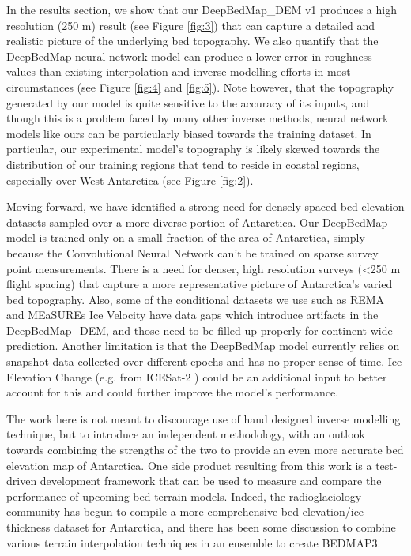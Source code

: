 \documentclass[tc, manuscript]{copernicus}
\begin{document}
In the results section, we show that our DeepBedMap\_DEM v1 produces a high resolution (250 m) result (see Figure \ref{fig:3}) that can capture a detailed and realistic picture of the underlying bed topography.
We also quantify that the DeepBedMap neural network model can produce a lower error in roughness values than existing interpolation and inverse modelling efforts in most circumstances (see Figure \ref{fig:4} and \ref{fig:5}).
Note however, that the topography generated by our model is quite sensitive to the accuracy of its inputs, and though this is a problem faced by many other inverse methods, neural network models like ours can be particularly biased towards the training dataset.
In particular, our experimental model's topography is likely skewed towards the distribution of our training regions that tend to reside in coastal regions, especially over West Antarctica (see Figure \ref{fig:2}).

Moving forward, we have identified a strong need for densely spaced bed elevation datasets sampled over a more diverse portion of Antarctica.
Our DeepBedMap model is trained only on a small fraction of the area of Antarctica, simply because the Convolutional Neural Network can't be trained on sparse survey point measurements.
There is a need for denser, high resolution surveys (<250 m flight spacing) that capture a more representative picture of Antarctica's varied bed topography.
Also, some of the conditional datasets we use such as REMA \citep{HowatReferenceElevationModel2019} and MEaSUREs Ice Velocity \citep{RignotMEaSUREsInSARBasedAntarctica2017} have data gaps which introduce artifacts in the DeepBedMap\_DEM, and those need to be filled up properly for continent-wide prediction.
Another limitation is that the DeepBedMap model currently relies on snapshot data collected over different epochs and has no proper sense of time.
Ice Elevation Change (e.g. from ICESat-2 \citep{MarkusIceCloudland2017}) could be an additional input to better account for this and could further improve the model's performance.

The work here is not meant to discourage use of hand designed inverse modelling technique, but to introduce an independent methodology, with an outlook towards combining the strengths of the two to provide an even more accurate bed elevation map of Antarctica.
One side product resulting from this work is a test-driven development framework that can be used to measure and compare the performance of upcoming bed terrain models.
Indeed, the radioglaciology community has begun to compile a more comprehensive bed elevation/ice thickness dataset for Antarctica, and there has been some discussion to combine various terrain interpolation techniques in an ensemble to create BEDMAP3.
\end{document}
